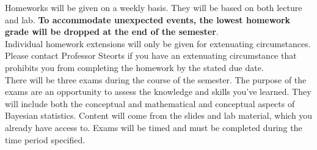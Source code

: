 \documentclass[11pt]{article}
\begin{document}

%




Homeworks will be given on a weekly basis. They will be based on both lecture and lab. \textbf{To accommodate unexpected events, the lowest homework grade will be dropped at the end of the semester}.\\

Individual homework extensions will only be given for extenuating circumstances. Please contact Professor Steorts if you have an extenuating circumstance that prohibits you from completing the homework by the stated due date.\\

There will be three exams during the course of the semester. The purpose of the exams are an opportunity to assess the knowledge and skills you’ve learned. They will include both the conceptual and mathematical and conceptual aspects of Bayesian statistics. Content will come from the slides and lab material, which you already have access to. Exams will be timed and must be completed during the time period specified. \\
\end{document}
